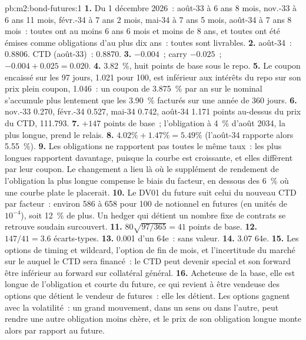 \begin{solution}{pb:m2:bond-futures:1}
\textbf{1.} Du 1 décembre 2026~: août-33 à 6 ans 8 mois, nov.-33 à 6 ans 11
mois, févr.-34 à 7 ans 2 mois, mai-34 à 7 ans 5 mois, août-34 à 7 ans 8
mois~: toutes ont au moins 6 ans 6 mois et moins de 8 ans, et toutes ont été émises comme
obligations d'au plus dix ans~: toutes sont livrables.
\textbf{2.} août-34~: 0.8806. CTD (août-33)~: 0.8870.
\textbf{3.}  $-0.004$~; carry $-0.025$~;  $-0.004 + 0.025 = 0.020$.
\textbf{4.} 3.82~\%, huit points de base sous le repo.
\textbf{5.} Le coupon encaissé sur les 97 jours, 1.021 pour 100, est inférieur aux
intérêts du repo sur son prix plein coupon, 1.046~: un coupon de 3.875~\% par an sur le
nominal s'accumule plus lentement que les 3.90~\% facturés sur une année de 360 jours.
\textbf{6.} nov.-33 0.270, févr.-34 0.527, mai-34 0.742, août-34 1.171 points au-dessus du prix
du CTD, 111.793.
\textbf{7.} $+147$ points de base~; l'obligation à 4~\% d'août 2034, la plus longue,
prend le relais.
\textbf{8.} $4.02\% + 1.47\% = 5.49\%$ (l'août-34 rapporte alors 5.55~\%).
\textbf{9.} Les obligations ne rapportent pas toutes le même taux~: les plus longues rapportent davantage, puisque
la courbe est croissante, et elles diffèrent par leur coupon. Le changement a lieu là où le
supplément de rendement de l'obligation la plus longue compense le biais du facteur, en dessous des 6~\% où
une courbe plate le placerait.
\textbf{10.} Le DV01 du future suit celui du nouveau CTD par facteur~: environ
586 à 658 pour 100 de notionnel en futures (en unités de $10^{-4}$), soit 12~\% de plus. Un
hedger qui détient un nombre fixe de contrats se retrouve soudain surcouvert.
\textbf{11.} $80\sqrt{97/365} = 41$ points de base.
\textbf{12.} $147/41 = 3.6$ écarts-types.
\textbf{13.} 0.001 d'un 64e~: sans valeur.
\textbf{14.} 3.07 64e.
\textbf{15.} Les options de timing et wildcard, l'option de fin de mois, et
l'incertitude du marché sur le  auquel le CTD sera financé~: le CTD peut
devenir special et son forward être inférieur au forward sur collatéral général.
\textbf{16.} Acheteuse de la base, elle est longue de l'obligation et courte du future, ce qui
revient à être vendeuse des options que détient le vendeur de futures~: elle les détient. Les options gagnent avec
la volatilité~: un grand mouvement, dans un sens ou dans l'autre, peut rendre une autre
obligation moins chère, et le prix de son obligation longue monte alors par rapport au future.

\end{solution}
